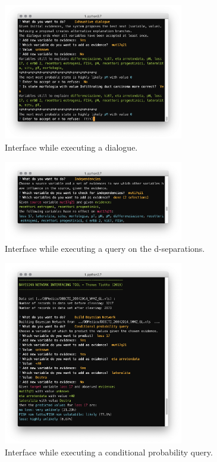 \begin{figure}[htbp]
\centerline{\includegraphics[width=0.7\textwidth]{methodology/images/nl-dialogue}}
\caption{Interface while executing a dialogue.}
\label{fig:nl-dialogue}
\end{figure}

\begin{figure}[htbp]
\centerline{\includegraphics[width=0.7\textwidth]{methodology/images/nl-independencies-query}}
\caption{Interface while executing a query on the d-separations.}
\label{fig:nl-independencies}
\end{figure}

\begin{figure}[htbp]
\centerline{\includegraphics[width=0.7\textwidth]{methodology/images/nl-conditional-query}}
\caption{Interface while executing a conditional probability query.}
\label{fig:nl-conditional}
\end{figure}


